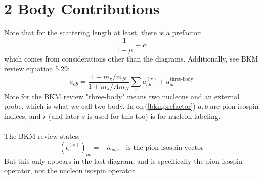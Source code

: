 \documentclass[11pt]{article}
\begin{document}
\section{2 Body Contributions}
Note that for the scattering length at least, there is a prefactor:
\begin{equation}
    \frac{1}{1+\mu} \equiv \alpha
\end{equation}
which comes from considerations other than the diagrams. Additionally, see BKM review equation 5.29:
\begin{equation}
    a_{ab}= \frac{1+ m_\pi/m_N}{1+m_\pi/Am_N} \sum_r a^{(r)}_{ab} + a^{\text{three-body}}_{ab}\label{bkmprefactor}
\end{equation}
Note for the BKM review "three-body" means two nucleons and an external probe, which is what we call two body.
In eq.(\ref{bkmprefactor}) $a,b$ are pion isospin indices, and $r$ (and later $s$ is used for this too) is for nucleon labeling. \\~\\

The BKM review states:
\begin{equation}
    (t_c^{(\pi)})_{ab}= -i \epsilon_{abc}\quad\text{is the pion isospin vector}
\end{equation}
But this only appears in the last diagram, and is specifically the pion isospin operator, not the nucleon isospin operator.
\end{document}
